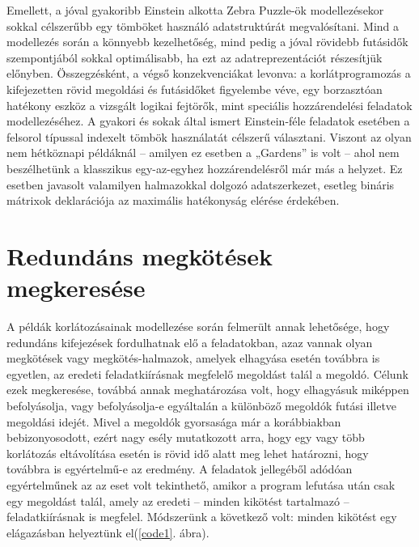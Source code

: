 \documentclass[12pt,a4paper]{report}
\begin{document}
    Emellett, a jóval gyakoribb Einstein alkotta Zebra Puzzle-ök modellezésekor sokkal célszerűbb egy tömböket használó adatstruktúrát megvalósítani.
    Mind a modellezés során a könnyebb kezelhetőség, mind pedig a jóval rövidebb futásidők szempontjából sokkal optimálisabb, ha ezt az adatreprezentációt részesítjük előnyben.
    Összegzésként, a végső konzekvenciákat levonva: a korlátprogramozás a kifejezetten rövid megoldási és futásidőket figyelembe véve, egy borzasztóan hatékony eszköz a vizsgált logikai fejtörők, mint speciális hozzárendelési feladatok modellezéséhez.
    A gyakori és sokak által ismert Einstein-féle feladatok esetében a felsorol típussal indexelt tömbök használatát célszerű választani.
    Viszont az olyan nem hétköznapi példáknál – amilyen ez esetben a „Gardens” is volt – ahol nem beszélhetünk a klasszikus egy-az-egyhez hozzárendelésről már más a helyzet.
    Ez esetben javasolt valamilyen halmazokkal dolgozó adatszerkezet, esetleg bináris mátrixok deklarációja az maximális hatékonyság elérése érdekében.

\chapter{Redundáns megkötések megkeresése}

    A példák korlátozásainak modellezése során felmerült annak lehetősége, hogy redundáns kifejezések fordulhatnak elő a feladatokban, azaz vannak olyan megkötések vagy megkötés-halmazok, amelyek elhagyása esetén továbbra is egyetlen, az eredeti feladatkiírásnak megfelelő megoldást talál a megoldó.
    Célunk ezek megkeresése, továbbá annak meghatározása volt, hogy elhagyásuk miképpen befolyásolja, vagy befolyásolja-e egyáltalán a különböző megoldók futási illetve megoldási idejét.
    Mivel a megoldók gyorsasága már a korábbiakban bebizonyosodott, ezért nagy esély mutatkozott arra, hogy  egy vagy több korlátozás eltávolítása esetén is rövid idő alatt meg lehet határozni, hogy továbbra is egyértelmű-e az eredmény.
    A feladatok jellegéből adódóan egyértelműnek az az eset volt tekinthető, amikor a program lefutása után csak egy megoldást talál, amely az eredeti – minden kikötést tartalmazó – feladatkiírásnak is megfelel.
    Módszerünk a következő volt: minden kikötést egy elágazásban helyeztünk el(\ref{code1}. ábra).
\end{document}
